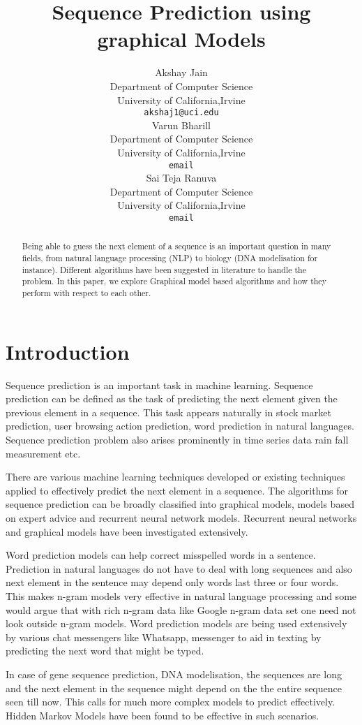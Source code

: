 \documentclass{article} %
\title{Sequence Prediction using graphical Models }
\author{
Akshay Jain\\
Department of Computer Science\\
University of California,Irvine \\
\texttt{akshaj1@uci.edu} \\
\And
Varun Bharill \\
Department of Computer Science\\
University of California,Irvine \\
\texttt{email} \\
\And
Sai Teja Ranuva \\
Department of Computer Science\\
University of California,Irvine \\
\texttt{email} \\
}
\begin{document}
\maketitle

\begin{abstract}
Being able to guess the next element of a sequence is an important question in many fields, from natural language processing (NLP) to biology (DNA modelisation for instance). Different algorithms have been suggested in literature to handle the problem. In this paper, we explore Graphical model based algorithms and how they perform with respect to each other.
\end{abstract}

\section{Introduction}
\label{Introduction}
Sequence prediction is an important task in machine learning. Sequence prediction can be defined as the task of predicting the next element given the previous element in a sequence. This task appears naturally in stock market prediction, user browsing action prediction, word prediction in natural languages. Sequence prediction problem also arises prominently in time series data rain fall measurement etc.

There are various machine learning techniques developed or existing techniques applied to effectively predict the next element in a sequence. The algorithms for sequence prediction can be broadly classified into graphical models, models based on expert advice and recurrent neural network models. Recurrent neural networks and graphical models have been investigated extensively. 

Word prediction models can help correct misspelled words in a sentence. Prediction in natural languages do not have to deal with long sequences and also next element in the sentence may depend only words last three or four words. This makes n-gram models very effective in natural language processing and some would argue that with rich n-gram data like Google n-gram data set one need not look outside n-gram models. Word prediction models are being used extensively by various chat messengers like Whatsapp, messenger to aid in texting by predicting the next word that might be typed.

In case of gene sequence prediction, DNA modelisation, the sequences are long and the next element in the sequence might depend on the the entire sequence seen till now. This calls for much more complex models to predict effectively. Hidden Markov Models have been found to be effective in such scenarios. 
\end{document}
